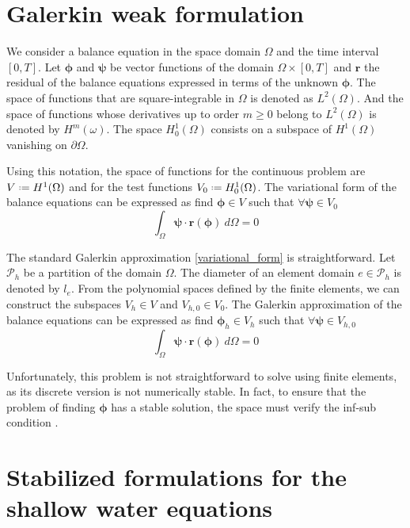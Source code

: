 \section{Galerkin weak formulation}



We consider a balance equation in the space domain $\Omega$ and the time interval $[0,T]$. Let $\bm{\phi}$ and $\bm{\psi}$ be vector functions of the domain $\Omega \times [0,T]$ and $\mathbf{r}$ the residual of the balance equations expressed in terms of the unknown $\bm{\phi}$.
The space of functions that are square-integrable in $\Omega$ is denoted as $L^2(\Omega)$. And the space of functions whose derivatives up to order $m\geq0$ belong to $L^2(\Omega)$ is denoted by $H^m(\omega)$. The space $H_0^1(\Omega)$ consists on a subspace of $H^1(\Omega)$ vanishing on $\partial \Omega$.

Using this notation, the space of functions for the continuous problem are $V \defeq H^1(\Omega)$ and for the test functions $V_0 \defeq H_0^1(\Omega)$.
The variational form of the balance equations can be expressed as find $\bm{\phi} \in V$ such that $\forall \bm{\psi} \in V_0$
\begin{equation} \label{variational_form}
    \int_\Omega \bm{\psi} \cdot \mathbf{r}(\bm{\phi}) \ d\Omega = 0
\end{equation}



The standard Galerkin approximation \ref{variational_form} is straightforward. Let $\mathcal{P}_h$ be a partition of the domain $\Omega$. The diameter of an element domain $e\in\mathcal{P}_h$ is denoted by $l_e$. From the polynomial spaces defined by the finite elements, we can construct the subspaces $V_h\in V$ and $V_{h,0}\in V_0$. The Galerkin approximation of the balance equations can be expressed as find $\bm{\phi}_h \in V_h$ such that $\forall \bm{\psi} \in V_{h,0}$
\begin{equation} \label{discrete_variational}
    \int_\Omega \bm{\psi} \cdot \mathbf{r}(\bm{\phi}) \ d\Omega = 0
\end{equation}

Unfortunately, this problem is not straightforward to solve using finite elements, as its discrete version is not numerically stable. In fact, to ensure that the problem of finding $\bm{\phi}$ has a stable solution, the space must verify the inf-sub condition \cite{codina2011}.



\section{Stabilized formulations for the shallow water equations}
\label{sec:fic_fem_stabilization}



